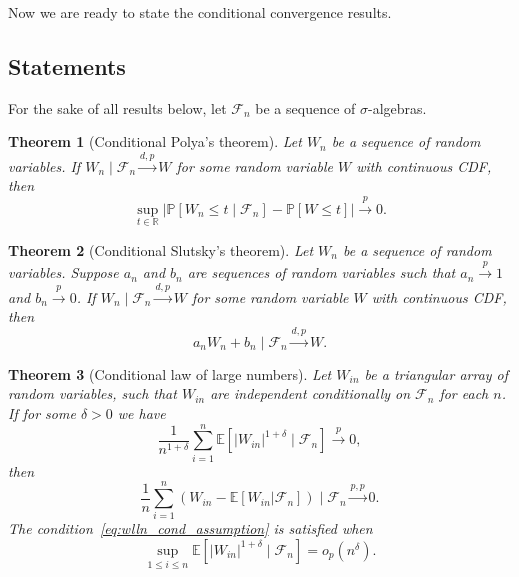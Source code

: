 \documentclass[aos]{imsart}
\newtheorem{theorem}{Theorem}
\theoremstyle{definition}
\theoremstyle{remark}
\newcommand{\E}{\mathbb E}								%
\renewcommand{\P}{\mathbb{P}}							%
\newcommand{\R}{\mathbb{R}}								%
\newcommand{\convp}{\overset p \rightarrow}             %
\newcommand{\convdp}{\overset {d,p} \longrightarrow}    %
\newcommand{\convpp}{\overset {p,p} \longrightarrow}    %
\begin{document}
\noindent Now we are ready to state the conditional convergence results. 

\subsection{Statements}

For the sake of all results below, let $\mathcal F_n$ be a sequence of $\sigma$-algebras.

\begin{theorem}[Conditional Polya's theorem]\label{thm:cond_polya} 
	Let $W_n$ be a sequence of random variables. If $W_n \mid \mathcal F_n \convdp W$ for some random variable $W$ with continuous CDF, then
	\begin{equation}
		\sup_{t \in \R}|\P[W_n \leq t \mid \mathcal F_n] - \P[W \leq t]| \convp 0.
	\end{equation}

\end{theorem}

\begin{theorem}[Conditional Slutsky's theorem]\label{thm:cond_slutsky}
	Let $W_n$ be a sequence of random variables. Suppose $a_n$ and $b_n$ are sequences of random variables such that $a_n \convp 1$ and $b_n \convp 0$. If $W_n \mid \mathcal F_n \convdp W$ for some random variable $W$ with continuous CDF, then
	\begin{equation}
		a_n W_n + b_n \mid \mathcal F_n \convdp W.
	\end{equation}
	
\end{theorem}

\begin{theorem}[Conditional law of large numbers]\label{thm:wlln_cond} 
	Let $W_{in}$ be a triangular array of random variables, such that $W_{in}$ are independent conditionally on $\mathcal F_n$ for each $n$. If for some $\delta > 0$ we have
	\begin{equation}
		\frac{1}{n^{1+\delta}}\sum_{i=1}^n\E[|W_{in}|^{1+\delta}\mid\mathcal{F}_n] \convp 0,
		\label{eq:wlln_cond_assumption}
	\end{equation}
	then 
	\begin{equation}
		\frac{1}{n} \sum_{i = 1}^n (W_{in} - \E[W_{in}|\mathcal{F}_n]) \mid \mathcal F_n \convpp 0.
		\label{eq:wlln_cond_conclusion}
	\end{equation}
	The condition~\eqref{eq:wlln_cond_assumption} is satisfied when
	\begin{equation}
		\sup_{1\leq i\leq n}\E[|W_{in}|^{1+\delta} \mid \mathcal{F}_n]=o_p(n^{\delta}).
		\label{eq:wlln_cond_sufficient}
	\end{equation}
\end{theorem}
\end{document}

